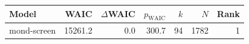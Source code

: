 \begin{tabular}{lrrrrrr}
\toprule
Model & WAIC & $\Delta$WAIC & $p_{\mathrm{WAIC}}$ & $k$ & $N$ & Rank \\
\midrule
mond-screen & 15261.2 & 0.0 & 300.7 & 94 & 1782 & 1 \\
\bottomrule
\end{tabular}
